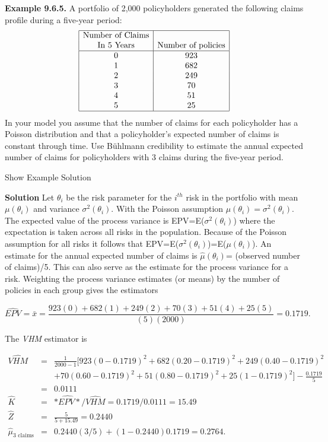 \documentclass[]{book}
\theoremstyle{definition}
\theoremstyle{definition}
\theoremstyle{definition}
\theoremstyle{remark}
\begin{document}
\textbf{Example 9.6.5.} A portfolio of 2,000 policyholders generated the
following claims profile during a five-year period: \[\begin{matrix}
\begin{array}{|c|c|}
\hline
\text{Number of Claims} &   \\
\text{In 5 Years}           &  \text{Number of policies}\\
\hline
 0 &  923 \\
 1 &  682 \\  
 2 &  249 \\  
 3 &  70   \\
 4 &  51   \\  
 5 &  25   \\     
\hline
\end{array}
\end{matrix}\] In your model you assume that the number of claims for
each policyholder has a Poisson distribution and that a policyholder's
expected number of claims is constant through time. Use Bühlmann
credibility to estimate the annual expected number of claims for
policyholders with 3 claims during the five-year period.

Show Example Solution

\hypertarget{toggleExampleCred.6.5}{}
\textbf{Solution} Let \(\theta_i\) be the risk parameter for the
\(i^{th}\) risk in the portfolio with mean \(\mu(\theta_i)\) and
variance \(\sigma^2(\theta_i)\). With the Poisson assumption
\(\mu(\theta_i)=\sigma^2(\theta_i)\). The expected value of the process
variance is EPV=E(\(\sigma^2(\theta_i)\)) where the expectation is taken
across all risks in the population. Because of the Poisson assumption
for all risks it follows that
EPV=E(\(\sigma^2(\theta_i)\))=E(\(\mu(\theta_i)\)). An estimate for the
annual expected number of claims is \(\hat{\mu}(\theta_i)\)= (observed
number of claims)/5. This can also serve as the estimate for the process
variance for a risk. Weighting the process variance estimates (or means)
by the number of policies in each group gives the estimators

\begin{equation*}  
\widehat{EPV}=\bar{x}=\frac{923(0)+682(1)+249(2)+70(3)+51(4)+25(5)}{(5)(2000)}=0.1719.
\end{equation*}

The \emph{VHM} estimator is

\begin{eqnarray*}
\hat{VHM}&=&\frac{1}{2000-1}[923(0-0.1719)^2+682(0.20-0.1719)^2+249(0.40-0.1719)^2\\
                            &   &+70(0.60-0.1719)^2+51(0.80-0.1719)^2+25(1-0.1719)^2]-\frac{0.1719}{5}\\
                            &=& 0.0111\\
               \hat{K}  &=& \hat{*EPV*}/\hat{VHM}=0.1719/0.0111=15.49\\
               \hat{Z}  &=& \frac{5}{5+15.49}=0.2440\\
               \hat{\mu}_{3 \textrm{ claims}}& = & 0.2440(3/5)+(1-0.2440)0.1719=0.2764 .\\
\end{eqnarray*}
\end{document}
